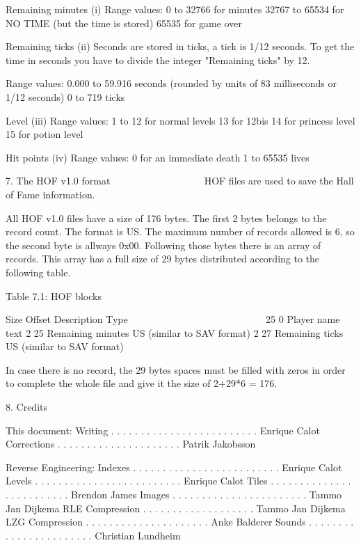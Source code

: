  Remaining minutes (i)
  Range values:
   0     to 32766 for minutes
   32767 to 65534 for NO TIME (but the time is stored)
   65535 for game over

 Remaining ticks (ii)
  Seconds are stored in ticks, a tick is 1/12 seconds. To get the time in
  seconds you have to divide the integer "Remaining ticks" by 12.

  Range values:
   0.000 to 59.916 seconds
                   (rounded by units of 83 milliseconds or 1/12 seconds)
   0     to 719    ticks

 Level (iii)
  Range values:
   1  to 12 for normal levels
   13 for 12bis
   14 for princess level
   15 for potion level

 Hit points (iv)
  Range values:
   0 for an immediate death
   1 to 65535 lives


7. The HOF v1.0 format
   ~~~ ~~~ ~~~~ ~~~~~~
 HOF files are used to save the Hall of Fame information.

 All HOF v1.0 files have a size of 176 bytes. The first 2 bytes belongs to
 the record count. The format is US. The maximum number of records allowed
 is 6, so the second byte is allways 0x00.
 Following those bytes there is an array of records. This array has a full
 size of 29 bytes distributed according to the following table.

                   Table 7.1: HOF blocks
                   ~~~~~~~~~~~~~~~~~~~~~

   Size Offset Description                  Type
   ~~~~ ~~~~~~ ~~~~~~~~~~~                  ~~~~
     25      0 Player name                  text
      2     25 Remaining minutes            US (similar to SAV format)
      2     27 Remaining ticks              US (similar to SAV format)

 In case there is no record, the 29 bytes spaces must be filled with zeros
 in order to complete the whole file and give it the size of 2+29*6 = 176.


8. Credits
   ~~~~~~~

 This document:
  Writing . . . . . . . . . . . . . . . . . . . . . . . . . Enrique Calot
  Corrections . . . . . . . . . . . . . . . . . . . . .  Patrik Jakobsson

 Reverse Engineering:
  Indexes . . . . . . . . . . . . . . . . . . . . . . . . . Enrique Calot
  Levels . . . . . . . . . . . . . . . . . . . . . . . . .  Enrique Calot
  Tiles  . . . . . . . . . . . . . . . . . . . . . . . . .  Brendon James
  Images . . . . . . . . . . . . . . . . . . . . . . .  Tammo Jan Dijkema
  RLE Compression . . . . . . . . . . . . . . . . . . . Tammo Jan Dijkema
  LZG Compression . . . . . . . . . . . . . . . . . . . . . Anke Balderer
  Sounds . . . . . . . . . . . . . . . . . . . . . . . Christian Lundheim

